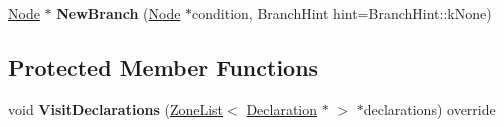 \begin{DoxyCompactItemize}
\item 
\hyperlink{classv8_1_1internal_1_1compiler_1_1_node}{Node} $\ast$ {\bfseries New\+Branch} (\hyperlink{classv8_1_1internal_1_1compiler_1_1_node}{Node} $\ast$condition, Branch\+Hint hint=Branch\+Hint\+::k\+None)\hypertarget{classv8_1_1internal_1_1compiler_1_1_ast_graph_builder_acb4edb90c9987466dfb63fd1ed4881a2}{}\label{classv8_1_1internal_1_1compiler_1_1_ast_graph_builder_acb4edb90c9987466dfb63fd1ed4881a2}

\end{DoxyCompactItemize}
\subsection*{Protected Member Functions}
\begin{DoxyCompactItemize}
\item 
void {\bfseries Visit\+Declarations} (\hyperlink{classv8_1_1internal_1_1_zone_list}{Zone\+List}$<$ \hyperlink{classv8_1_1internal_1_1_declaration}{Declaration} $\ast$ $>$ $\ast$declarations) override\hypertarget{classv8_1_1internal_1_1compiler_1_1_ast_graph_builder_a8a4a5d937485b3c739fc8ce2b10ae3b1}{}\label{classv8_1_1internal_1_1compiler_1_1_ast_graph_builder_a8a4a5d937485b3c739fc8ce2b10ae3b1}

\end{DoxyCompactItemize}

